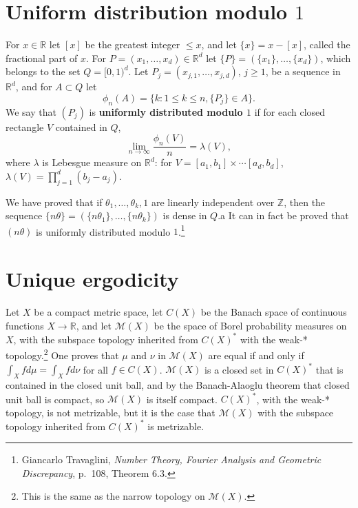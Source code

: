 \documentclass{article}
\theoremstyle{definition}
\begin{document}
\section{Uniform distribution modulo $1$}
For $x \in \mathbb{R}$ let $[x]$ be the greatest integer $\leq x$, and let
$\{x\}=x-[x]$, called the fractional part of $x$.
For $P=(x_1,\ldots,x_d) \in \mathbb{R}^d$ let
$\{P\} = (\{x_1\},\ldots,\{x_d\})$, which belongs to
the set $Q=[0,1)^d$. 
Let $P_j=(x_{j,1},\ldots,x_{j,d})$, $j \geq 1$, be a sequence in $\mathbb{R}^d$, and
for $A \subset Q$ let
\[
\phi_n(A) = \{k: 1 \leq k \leq n, \{P_j\} \in A\}.
\]
We say that $(P_j)$ is \textbf{uniformly distributed modulo $1$} if 
for each closed rectangle $V$ contained in $Q$,
\[
\lim_{n \to \infty} \frac{\phi_n(V)}{n} = \lambda(V),
\]
where $\lambda$ is Lebesgue measure on $\mathbb{R}^d$: for
$V=[a_1,b_1] \times \cdots [a_d,b_d]$, $\lambda(V) = \prod_{j=1}^d (b_j-a_j)$. 

We have proved that if $\theta_1,\ldots,\theta_k,1$ are linearly independent over $\mathbb{Z}$, 
then the sequence $\{n \theta\} = (\{n\theta_1\},\ldots,\{n\theta_k\})$ is dense in $Q$.a
It can in fact be proved that $(n\theta)$ is uniformly distributed modulo $1$.\footnote{Giancarlo Travaglini,
{\em Number Theory, Fourier Analysis and Geometric Discrepancy},
p.~108, Theorem 6.3.}


\section{Unique ergodicity}
Let $X$ be a compact metric space,
let $C(X)$ be the Banach space of continuous functions $X \to \mathbb{R}$, 
 and let $\mathscr{M}(X)$ be the space of Borel probability measures on $X$, with the subspace topology inherited
 from $C(X)^*$ with the weak-* topology.\footnote{This is the same as the narrow topology on $\mathscr{M}(X)$.}
 One proves that $\mu$ and $\nu$ in $\mathscr{M}(X)$ are equal if and only if $\int_X f d\mu = \int_X f d\nu$ for all
$f \in C(X)$.
$\mathscr{M}(X)$ is a closed set in $C(X)^*$ that is contained in the closed unit ball, and  by the Banach-Alaoglu
theorem that closed unit ball is compact, so $\mathscr{M}(X)$ is itself compact. $C(X)^*$, with the weak-* topology, is not metrizable, 
but it is the case that $\mathscr{M}(X)$ with the subspace topology inherited from $C(X)^*$ is metrizable.
\end{document}
